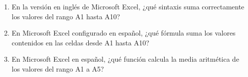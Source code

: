 \documentclass[10pt,a4paper]{article}
\begin{document}
\begin{enumerate}[label=\textbf{\arabic*.}]
\begin{enumerate}[label=\textbf{\Alph*)}]
\end{enumerate}
\vspace{0.15cm}
\item En la versión en inglés de Microsoft Excel, ¿qué sintaxis suma correctamente los valores del rango A1 hasta A10?
\begin{enumerate}[label=\textbf{\Alph*)}]
\end{enumerate}
\vspace{0.15cm}
\item En Microsoft Excel configurado en español, ¿qué fórmula suma los valores contenidos en las celdas desde A1 hasta A10?
\begin{enumerate}[label=\textbf{\Alph*)}]
\end{enumerate}
\vspace{0.15cm}
\item En Microsoft Excel en español, ¿qué función calcula la media aritmética de los valores del rango A1 a A5?
\begin{enumerate}[label=\textbf{\Alph*)}]
\end{enumerate}
\vspace{0.15cm}
\end{enumerate}\n
\vspace{0.4cm}
\end{document}
